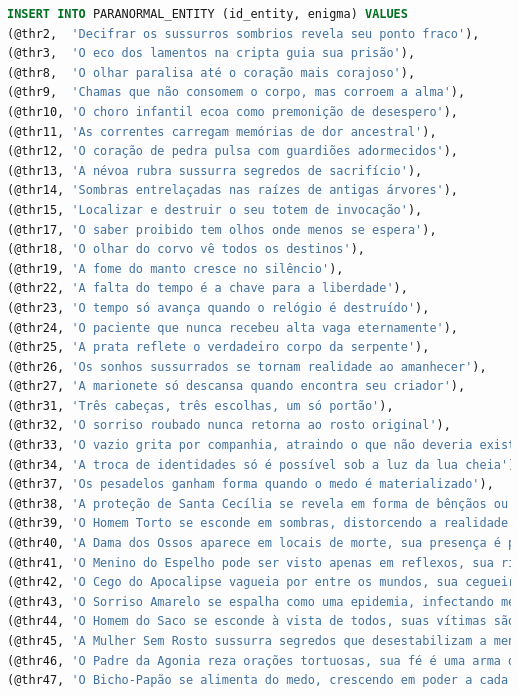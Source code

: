 \documentclass[12pt,a4paper]{report}
\begin{document}
\begin{lstlisting}[language=SQL, caption=population.sql]
INSERT INTO PARANORMAL_ENTITY (id_entity, enigma) VALUES
(@thr2,  'Decifrar os sussurros sombrios revela seu ponto fraco'),
(@thr3,  'O eco dos lamentos na cripta guia sua prisão'),
(@thr8,  'O olhar paralisa até o coração mais corajoso'),
(@thr9,  'Chamas que não consomem o corpo, mas corroem a alma'),
(@thr10, 'O choro infantil ecoa como premonição de desespero'),
(@thr11, 'As correntes carregam memórias de dor ancestral'),
(@thr12, 'O coração de pedra pulsa com guardiões adormecidos'),
(@thr13, 'A névoa rubra sussurra segredos de sacrifício'),
(@thr14, 'Sombras entrelaçadas nas raízes de antigas árvores'),
(@thr15, 'Localizar e destruir o seu totem de invocação'),
(@thr17, 'O saber proibido tem olhos onde menos se espera'),
(@thr18, 'O olhar do corvo vê todos os destinos'),
(@thr19, 'A fome do manto cresce no silêncio'),
(@thr22, 'A falta do tempo é a chave para a liberdade'),
(@thr23, 'O tempo só avança quando o relógio é destruído'),
(@thr24, 'O paciente que nunca recebeu alta vaga eternamente'),
(@thr25, 'A prata reflete o verdadeiro corpo da serpente'),
(@thr26, 'Os sonhos sussurrados se tornam realidade ao amanhecer'),
(@thr27, 'A marionete só descansa quando encontra seu criador'),
(@thr31, 'Três cabeças, três escolhas, um só portão'),
(@thr32, 'O sorriso roubado nunca retorna ao rosto original'),
(@thr33, 'O vazio grita por companhia, atraindo o que não deveria existir'),
(@thr34, 'A troca de identidades só é possível sob a luz da lua cheia'),
(@thr37, 'Os pesadelos ganham forma quando o medo é materializado'),
(@thr38, 'A proteção de Santa Cecília se revela em forma de bênçãos ou pragas'),
(@thr39, 'O Homem Torto se esconde em sombras, distorcendo a realidade ao seu redor'),
(@thr40, 'A Dama dos Ossos aparece em locais de morte, sua presença é precedida pelo som de ossos se movendo'),
(@thr41, 'O Menino do Espelho pode ser visto apenas em reflexos, sua risada ecoa em silêncio'),
(@thr42, 'O Cego do Apocalipse vagueia por entre os mundos, sua cegueira o torna um guia para tragédias'),
(@thr43, 'O Sorriso Amarelo se espalha como uma epidemia, infectando mentes e corações'),
(@thr44, 'O Homem do Saco se esconde à vista de todos, suas vítimas são levadas para a escuridão'),
(@thr45, 'A Mulher Sem Rosto sussurra segredos que desestabilizam a mente e a alma'),
(@thr46, 'O Padre da Agonia reza orações tortuosas, sua fé é uma arma de tortura'),
(@thr47, 'O Bicho-Papão se alimenta do medo, crescendo em poder a cada grito de criança');


\end{lstlisting}
\end{document}
